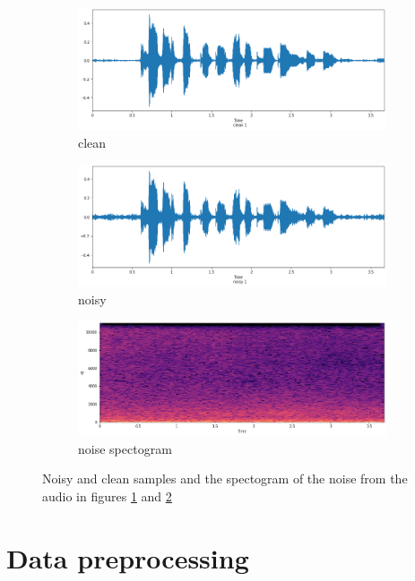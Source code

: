 \documentclass[12pt]{article}
\begin{document}
	\begin{figure}[H]
		\centering
		\begin{subfigure}{.5\textwidth}
			\centering
			\includegraphics[width=.8\linewidth]{wave_for_noise_clean}
			\caption{clean}
			\label{fig:wave_for_noise_clean}
		\end{subfigure}%
		\begin{subfigure}{.5\textwidth}
			\centering
			\includegraphics[width=.8\linewidth]{wave_for_noise_noisy}
			\caption{noisy}
			\label{fig:wave_for_noise_noisy}
		\end{subfigure}
		\label{fig:clean_noisy_n}
		
		\begin{subfigure}{.7\textwidth}
			\centering
			\includegraphics[width=.8\linewidth]{noise}
			\caption{noise spectogram}
			\label{fig:noise}
		\end{subfigure}
		\caption{Noisy and clean samples and the spectogram of the noise from the audio in figures \ref{fig:wave_for_noise_clean} and \ref{fig:wave_for_noise_noisy}}
		\label{fig:clean_noisy_noise}
	\end{figure}
	
	\section{Data preprocessing}
\end{document}
